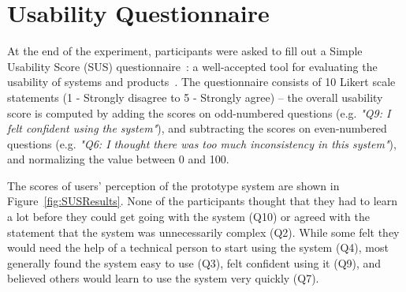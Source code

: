 


\section{Usability Questionnaire}
At the end of the experiment, participants were asked to fill out a Simple Usability Score (SUS) questionnaire~\cite{SUS}: a well-accepted tool for evaluating the usability of systems and products~\cite{interpretingSUS}.
The questionnaire consists of 10 Likert scale statements (1 - Strongly disagree to 5 - Strongly agree) -- the overall usability score is computed by adding the scores on odd-numbered questions (e.g. \emph{"Q9: I felt confident using the system"}), and subtracting the scores on even-numbered questions (e.g. \emph{"Q6: I thought there was too much inconsistency in this system"}), and normalizing the value between 0 and 100.

The scores of users' perception of the prototype system are shown in Figure~\ref{fig:SUSResults}.
None of the participants thought that they had to learn a lot before they could get going with the system (Q10) or agreed with the statement that the system was unnecessarily complex (Q2).
While some felt they would need the help of a technical person to start using the system (Q4), most generally found the system easy to use (Q3), felt confident using it (Q9), and believed others would learn to use the system very quickly (Q7).

